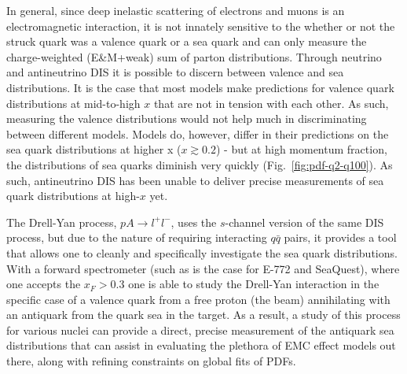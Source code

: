 In general, since deep inelastic scattering of electrons and muons is an electromagnetic interaction, it is not innately sensitive to the whether or not the struck quark was a valence quark or a sea quark and can only measure the charge-weighted (E\&M+weak) sum of parton distributions. Through neutrino and antineutrino DIS it is possible to discern between valence and sea distributions. It is the case that most models make predictions for valence quark distributions at mid-to-high $x$ that are not in tension with each other. As such, measuring the valence distributions would not help much in discriminating between different models. Models do, however, differ in their predictions on the sea quark distributions at higher x ($x\gtrsim0.2$) - but at high momentum fraction, the distributions of sea quarks diminish very quickly (Fig.~\ref{fig:pdf-q2-q100}). As such, antineutrino DIS has been unable to deliver precise measurements of sea quark distributions at high-$x$ yet.

The Drell-Yan process, $pA\rightarrow l^+l^-$, uses the $s$-channel version of the same DIS process, but due to the nature of requiring interacting $q\bar{q}$ pairs, it provides a tool that allows one to cleanly and specifically investigate the sea quark distributions. With a forward spectrometer (such as is the case for E-772 and SeaQuest), where one accepts the $x_F>0.3$ one is able to study the Drell-Yan interaction in the specific case of a valence quark from a free proton (the beam) annihilating with an antiquark from the quark sea in the target. As a result, a study of this process for various nuclei can provide a direct, precise measurement of the antiquark sea distributions that can assist in evaluating the plethora of EMC effect models out there, along with refining constraints on global fits of PDFs.

